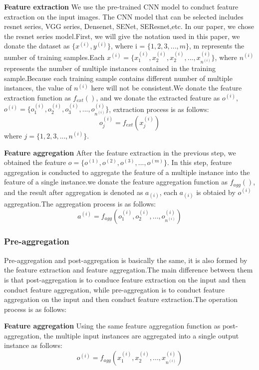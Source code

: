 \documentclass[10pt,twocolumn,letterpaper]{article}
\begin{document}
\textbf{Feature extraction}
We use the pre-trained CNN model to conduct feature extraction on the input images. The CNN model that can be selected includes resnet series, VGG series, Densenet, SENet, SEResnet,etc. In our paper, we chose the resnet series model.First, we will give the notation used in this paper, we donate the dataset as $\{x^{(i)}, y^{(i)}\}$, where i = $\{1,2,3,...,m\}$, m represents the number of training samples.Each $x^{(i)} = \{x^{(i)}_1, x^{(i)}_2, x^{(i)}_2,..., x^{(i)}_{n^{(i)}}\}$, where $n^{(i)}$ represents the number of multiple instances contained in the training sample.Because each training sample contains different number of multiple instances, the value of $n^{(i)}$ here will not be consistent.We donate the feature extraction function as $f_{ext}()$, and we donate the extracted feature as $o^{(i)}$, $o^{(i)} = \{o^{(i)}_1, o^{(i)}_2, o^{(i)}_3, ... ,o^{(i)}_{n^{(i)}}\}$, extraction process is as follows:
\begin{equation}
    o^{(i)}_j = f_{ext}(x^{(i)}_j)
\end{equation}
where $j = \{1,2,3,...,n^{(i)}\}$.

\textbf{Feature aggregation}
After the feature extraction in the previous step, we obtained the feature $o = \{o^{(1)}, o^{(2)}, o^{(3)}, ..., o^{(m)}\}$. In this step, feature aggregation is conducted to aggregate the feature of a multiple instance into the feature of a single instance.we donate the feature aggregation function as $f_{agg}()$, and the result after aggregation is denoted as $a_{(i)}$, each $a_{(i)}$ is obtaied by $o^{(i)}$ aggregation.The aggregation process is as follows:
\begin{equation}
    a^{(i)} = f_{agg}(o^{(i)}_1, o^{(i)}_2, ..., o^{(i)}_{n^{(i)}})
\end{equation}

\subsubsection{Pre-aggregation}
Pre-aggregation and post-aggregation is basically the same, it is also formed by the feature extraction and feature aggregation.The main difference between them is that post-aggregation is to conduce feature extraction on the input and then conduct feature aggregation, while pre-aggregation is to conduct feature aggregation on the input and then conduct feature extraction.The operation process is as follows:

\textbf{Feature aggregation}
Using the same feature aggregation function as post-aggregation, the multiple input instances are aggregated into a single output instance as follows:
\begin{equation}
    o^{(i)} = f_{agg}(x^{(i)}_1, x^{(i)}_2, ..., x^{(i)}_{n^{(i)}})
\end{equation}
\end{document}
